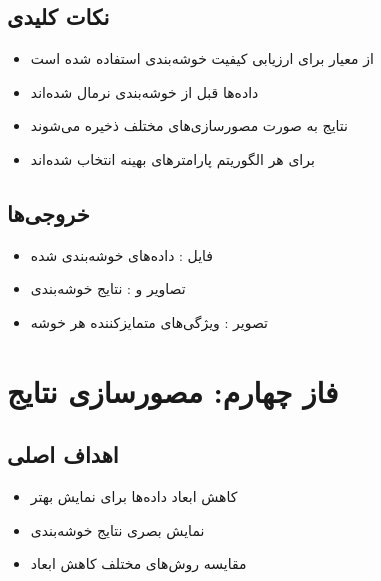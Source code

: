 \documentclass[a4paper,12pt]{article}
\let\nobreaksection\section
\renewcommand{\section}{\nobreaksection}  %
\begin{document}
	\subsection{نکات کلیدی}
	\begin{itemize}
		\item از معیار  برای ارزیابی کیفیت خوشه‌بندی استفاده شده است
		\item داده‌ها قبل از خوشه‌بندی نرمال شده‌اند
		\item نتایج به صورت مصورسازی‌های مختلف ذخیره می‌شوند
		\item برای هر الگوریتم پارامترهای بهینه انتخاب شده‌اند
	\end{itemize}
	
	\subsection{خروجی‌ها}
	\begin{itemize}
		\item فایل : داده‌های خوشه‌بندی شده
		\item تصاویر  و : نتایج خوشه‌بندی
		\item تصویر : ویژگی‌های متمایزکننده هر خوشه
	\end{itemize}
	
	\section{فاز چهارم: مصورسازی نتایج}
	
	\subsection{اهداف اصلی}
	\begin{itemize}
		\item کاهش ابعاد داده‌ها برای نمایش بهتر
		\item نمایش بصری نتایج خوشه‌بندی
		\item مقایسه روش‌های مختلف کاهش ابعاد
	\end{itemize}
	
\end{document}
